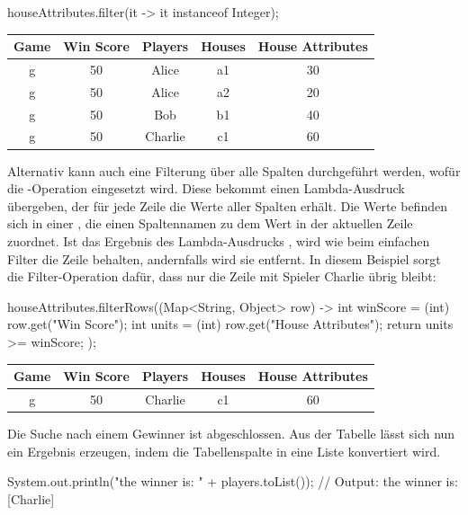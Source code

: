 \begin{jcodeblock}
    houseAttributes.filter(it -> it instanceof Integer);
\end{jcodeblock}

\begin{tabular}{|c|c|c|c|c|}
    \hline
    \textbf{Game} & \textbf{Win Score} & \textbf{Players} & \textbf{Houses} & \textbf{House Attributes} \\
    \hline
    g & 50 & Alice   & a1 & 30      \\
    g & 50 & Alice   & a2 & 20      \\
    g & 50 & Bob     & b1 & 40      \\
    g & 50 & Charlie & c1 & 60      \\
    \hline
\end{tabular}

Alternativ kann auch eine Filterung über alle Spalten durchgeführt werden, wofür die -Operation eingesetzt wird.
Diese bekommt einen Lambda-Ausdruck übergeben, der für jede Zeile die Werte aller Spalten erhält.
Die Werte befinden sich in einer , die einen Spaltennamen zu dem Wert in der aktuellen Zeile zuordnet.
Ist das Ergebnis des Lambda-Ausdrucks , wird wie beim einfachen Filter die Zeile behalten, andernfalls wird sie entfernt.
In diesem Beispiel sorgt die Filter-Operation dafür, dass nur die Zeile mit Spieler Charlie übrig bleibt:

\begin{jcodeblock}
    houseAttributes.filterRows((Map<String, Object> row) -> {
        int winScore = (int) row.get("Win Score");
        int units = (int) row.get("House Attributes");
        return units >= winScore;
    });
\end{jcodeblock}

\begin{tabular}{|c|c|c|c|c|}
    \hline
    \textbf{Game} & \textbf{Win Score} & \textbf{Players} & \textbf{Houses} & \textbf{House Attributes} \\
    \hline
    g & 50 & Charlie & c1 & 60 \\
    \hline
\end{tabular}

Die Suche nach einem Gewinner ist abgeschlossen.
Aus der Tabelle lässt sich nun ein Ergebnis erzeugen, indem die Tabellenspalte  in eine Liste konvertiert wird.

\begin{jcodeblock}
    System.out.println("the winner is: " + players.toList());
    // Output: the winner is: [Charlie]
\end{jcodeblock}

